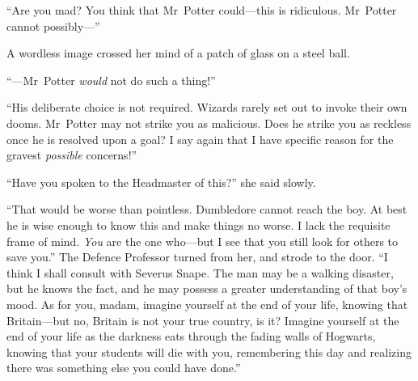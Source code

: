“Are you mad? You think that Mr~Potter could—this is ridiculous. Mr~Potter
cannot possibly—”

A wordless image crossed her mind of a patch of glass on a steel ball.

“—Mr~Potter \emph{would} not do such a thing!”

“His deliberate choice is not required. Wizards rarely set out to invoke their
own dooms. Mr~Potter may not strike you as malicious. Does he strike you as
reckless once he is resolved upon a goal? I say again that I have specific
reason for the gravest \emph{possible} concerns!”

“Have you spoken to the Headmaster of this?” she said slowly.

“That would be worse than pointless. Dumbledore cannot reach the boy. At best
he is wise enough to know this and make things no worse. I lack the requisite
frame of mind. \emph{You} are the one who—but I see that you still look for
others to save you.” The Defence Professor turned from her, and strode to the
door. “I think I shall consult with Severus Snape. The man may be a walking
disaster, but he knows the fact, and he may possess a greater understanding of
that boy’s mood. As for you, madam, imagine yourself at the end of your life,
knowing that Britain—but no, Britain is not your true country, is it? Imagine
yourself at the end of your life as the darkness eats through the fading walls
of Hogwarts, knowing that your students will die with you, remembering this day
and realizing there was something else you could have done.”
